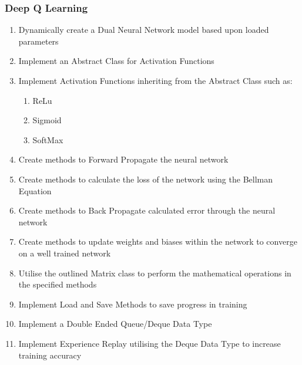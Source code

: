 \begin{flushleft}
            \subsubsection*{Deep Q Learning}
                \begin{enumerate}
                    \item Dynamically create a Dual Neural Network model based upon loaded parameters
                    \item Implement an Abstract Class for Activation Functions
                    \item Implement Activation Functions inheriting from the Abstract Class such as:
                    \begin{enumerate}
                        \item ReLu
                        \item Sigmoid
                        \item SoftMax
                    \end{enumerate}
                    \item Create methods to Forward Propagate the neural network
                    \item Create methods to calculate the loss of the network using the Bellman Equation
                    \item Create methods to Back Propagate calculated error through the neural network
                    \item Create methods to update weights and biases within the network to converge on a well trained network
                    \item Utilise the outlined Matrix class to perform the mathematical operations in the specified methods
                    \item Implement Load and Save Methods to save progress in training
                    \item Implement a Double Ended Queue/Deque Data Type
                    \item Implement Experience Replay utilising the Deque Data Type to increase training accuracy
                \end{enumerate}   

\end{flushleft}
